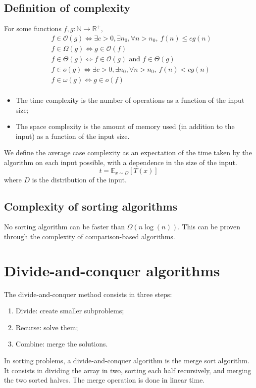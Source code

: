 \documentclass[12pt, openany]{report}
\newcommand{\R}{\mathbb{R}}
\theoremstyle{definition}
\begin{document}
\section{Definition of complexity}
For some functions $f,g:\mathbb{N} \to \R^+$, 
\begin{equation}
  	\begin{aligned}
		&f\in \mathcal{O}(g) \Longleftrightarrow \exists c>0, \exists n_0, \forall n>n_0,\ f(n)\le cg(n)\\
		&f\in \Omega(g)\Longleftrightarrow g\in \mathcal{O}(f)\\
		& f\in \Theta(g)\Longleftrightarrow f\in \mathcal{O}(g)\text{ and } f\in \Theta(g)\\
		&f\in o(g) \Longleftrightarrow \exists c>0, \exists n_0, \forall n>n_0,\ f(n)< cg(n)\\
		&f\in \omega(g)\Longleftrightarrow g\in o(f)\\
  	\end{aligned}
\end{equation}
\begin{itemize}
	\item The time complexity is the number of operations as a function of the input size;
	\item The space complexity is the amount of memory used (in addition to the input) as a function of the input size. 
\end{itemize}
We define the average case complexity as an expectation of the time taken by the algorithm on each input possible, with a dependence in the size of the input.
\begin{equation}
	t = \mathbb{E}_{x\sim D}[T(x)]
\end{equation}
where $D$ is the distribution of the input.\\
\section{Complexity of sorting algorithms}
No sorting algorithm can be faster than $\Omega(n \log(n))$. This can be proven through the complexity of comparison-based algorithms. 
\chapter{Divide-and-conquer algorithms}
The divide-and-conquer method consists in three steps:
\begin{enumerate}
	\item Divide: create smaller subproblems;
	\item Recurse: solve them;
	\item Combine: merge the solutions.
\end{enumerate}
In sorting problems, a divide-and-conquer algorithm is the merge sort algorithm. It consists in dividing the array in two, sorting each half recursively, and merging the two sorted halves. The merge operation is done in linear time.\\
\end{document}
